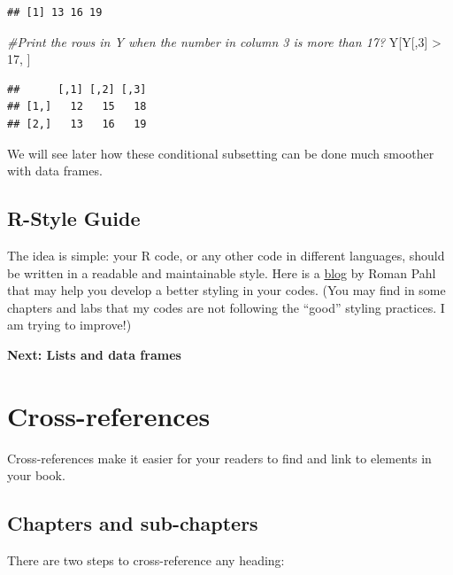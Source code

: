 \documentclass[
]{book}
\newenvironment{Shaded}{\begin{snugshade}}{\end{snugshade}}
\newcommand{\CommentTok}[1]{\textcolor[rgb]{0.56,0.35,0.01}{\textit{#1}}}
\newcommand{\DecValTok}[1]{\textcolor[rgb]{0.00,0.00,0.81}{#1}}
\newcommand{\NormalTok}[1]{#1}
\newcommand{\SpecialCharTok}[1]{\textcolor[rgb]{0.00,0.00,0.00}{#1}}
\theoremstyle{definition}
\theoremstyle{definition}
\theoremstyle{definition}
\theoremstyle{definition}
\theoremstyle{remark}
\begin{document}
\begin{verbatim}
## [1] 13 16 19
\end{verbatim}

\begin{Shaded}
\begin{Highlighting}[]
\CommentTok{\#Print the rows in Y when the number in column 3 is more than 17?}
\NormalTok{Y[Y[,}\DecValTok{3}\NormalTok{] }\SpecialCharTok{\textgreater{}} \DecValTok{17}\NormalTok{, ]}
\end{Highlighting}
\end{Shaded}

\begin{verbatim}
##      [,1] [,2] [,3]
## [1,]   12   15   18
## [2,]   13   16   19
\end{verbatim}

We will see later how these conditional subsetting can be done much smoother with data frames.

\hypertarget{r-style-guide}{%
\section{R-Style Guide}\label{r-style-guide}}

The idea is simple: your R code, or any other code in different languages, should be written in a readable and maintainable style. Here is a \href{https://rpahl.github.io/r-some-blog/my-r-style-guide/}{blog} by Roman Pahl that may help you develop a better styling in your codes. (You may find in some chapters and labs that my codes are not following the ``good'' styling practices. I am trying to improve!)

\textbf{Next: Lists and data frames}

\hypertarget{cross}{%
\chapter{Cross-references}\label{cross}}

Cross-references make it easier for your readers to find and link to elements in your book.

\hypertarget{chapters-and-sub-chapters}{%
\section{Chapters and sub-chapters}\label{chapters-and-sub-chapters}}

There are two steps to cross-reference any heading:
\end{document}
